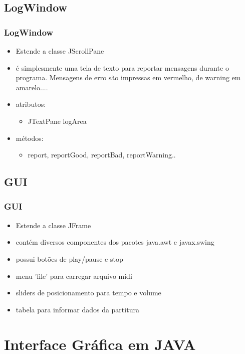 \documentclass{beamer}
\begin{document}
\subsection{LogWindow}
\begin{frame}
	\frametitle{LogWindow}
	\begin{itemize}
		\item Estende a classe JScrollPane
		\item é simplesmente uma tela de texto para reportar mensagens 
		durante o programa. Mensagens de erro são impressas em vermelho,
		de warning em amarelo....
		\item atributos:
		\begin{itemize}
			\item JTextPane logArea
		\end{itemize}
		\item métodos:
		\begin{itemize}
			\item report, reportGood, reportBad, reportWarning..
		\end{itemize}
	\end{itemize}
\end{frame}

\subsection{GUI}
\begin{frame}
	\frametitle{GUI}
	\begin{itemize}
		\item Estende a classe JFrame
		\item contém diversos componentes dos pacotes java.awt e javax.swing
		\item possui botões de play/pause e stop
		\item menu 'file' para carregar arquivo midi
		\item sliders de posicionamento para tempo e volume
		\item tabela para informar dados da partitura
	\end{itemize}
\end{frame}

\section{Interface Gráfica em JAVA}
\end{document}
